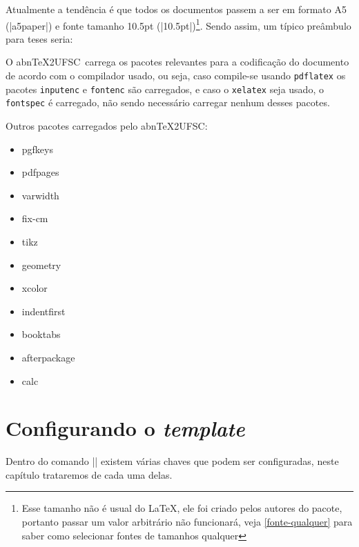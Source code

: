 \documentclass[openright]{memoir}
\newcommand*{\abntexUFSC}{abn\TeX2UFSC}
\begin{document}
Atualmente a tendência é que todos os documentos passem a ser em formato A5 (\code|a5paper|) e fonte tamanho 10.5pt (\code|10.5pt|)\footnote{Esse tamanho não é usual do \LaTeX, ele foi criado pelos autores do pacote, portanto passar um valor arbitrário não funcionará, veja \autoref{fonte-qualquer} para saber como selecionar fontes de tamanhos qualquer}. Sendo assim, um típico preâmbulo para teses seria:


O \abntexUFSC\ carrega os pacotes relevantes para a codificação do documento de acordo com o compilador usado, ou seja, caso compile-se usando \texttt{pdflatex} os pacotes \texttt{inputenc} e \texttt{fontenc} são carregados, e caso o \texttt{xelatex} seja usado, o \texttt{fontspec} é carregado, não sendo necessário carregar nenhum desses pacotes.

Outros pacotes carregados pelo \abntexUFSC:
\begin{multicols}{3}
\begin{itemize}
\item pgfkeys \item pdfpages    \item varwidth \item fix-cm       \item tikz \item geometry
\item xcolor  \item indentfirst \item booktabs \item afterpackage \item calc
\end{itemize}
\end{multicols}

\chapter{Configurando o \textit{template}}
Dentro do comando \code|\setUFSCtemplate| existem várias chaves que podem ser configuradas, neste capítulo trataremos de cada uma delas.
\end{document}
